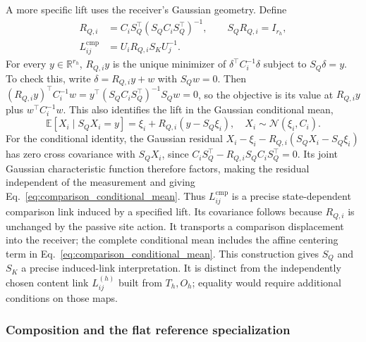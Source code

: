 \documentclass[twoside,11pt]{article}
\begin{document}
A more specific lift uses the receiver's Gaussian geometry. Define
\begin{align}
R_{Q,i}&=C_iS_Q^\top(S_QC_iS_Q^\top)^{-1},\qquad S_QR_{Q,i}=I_{r_h},\\
L_{ij}^{\mathrm{cmp}}
&=U_iR_{Q,i}S_KU_j^{-1}.
\label{eq:comparison_gaussian_lift}
\end{align}
For every $y\in\mathbb R^{r_h}$, $R_{Q,i}y$ is the unique minimizer of $\delta^\top C_i^{-1}\delta$ subject to $S_Q\delta=y$. To check this, write $\delta=R_{Q,i}y+w$ with $S_Qw=0$. Then $(R_{Q,i}y)^\top C_i^{-1}w=y^\top(S_QC_iS_Q^\top)^{-1}S_Qw=0$, so the objective is its value at $R_{Q,i}y$ plus $w^\top C_i^{-1}w$. This also identifies the lift in the Gaussian conditional mean,
\begin{equation}
\mathbb E[X_i\mid S_QX_i=y]
=\xi_i+R_{Q,i}(y-S_Q\xi_i),
\quad X_i\sim\mathcal N(\xi_i,C_i).
\label{eq:comparison_conditional_mean}
\end{equation}
For the conditional identity, the Gaussian residual $X_i-\xi_i-R_{Q,i}(S_QX_i-S_Q\xi_i)$ has zero cross covariance with $S_QX_i$, since $C_iS_Q^\top-R_{Q,i}S_QC_iS_Q^\top=0$. Its joint Gaussian characteristic function therefore factors, making the residual independent of the measurement and giving Eq.~\eqref{eq:comparison_conditional_mean}. Thus $L_{ij}^{\mathrm{cmp}}$ is a precise state-dependent comparison link induced by a specified lift. Its covariance follows because $R_{Q,i}$ is unchanged by the passive site action. It transports a comparison displacement into the receiver; the complete conditional mean includes the affine centering term in Eq.~\eqref{eq:comparison_conditional_mean}. This construction gives $S_Q$ and $S_K$ a precise induced-link interpretation. It is distinct from the independently chosen content link $L_{ij}^{(h)}$ built from $T_h,O_h$; equality would require additional conditions on those maps.

\subsubsection{Composition and the flat reference specialization}
\label{sec:vanishing_holonomy}
\end{document}
